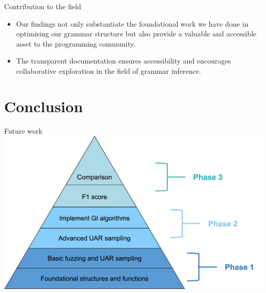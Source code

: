 \documentclass{beamer}
\begin{document}
	\begin{frame}{Contribution to the field}
		\begin{itemize}
			\item Our findings not only substantiate the foundational work we have done in optimising our grammar structure but also provide a valuable and accessible asset to the programming community.
			\item The transparent documentation ensures accessibility and encourages collaborative exploration in the field of grammar inference.
		\end{itemize}
		
	\end{frame}

	\section{Conclusion}

	\begin{frame}{Future work}
		\centering
		\includegraphics[height=0.8\textheight]{img/pyramid.png}
	\end{frame}
\end{document}
